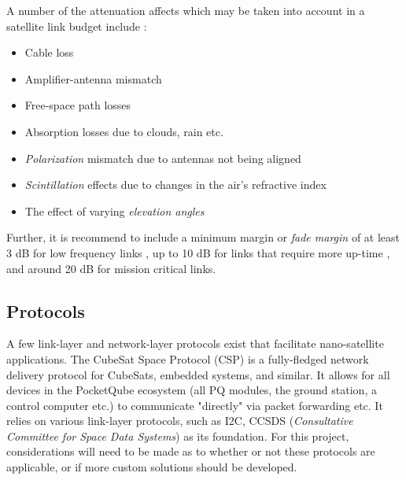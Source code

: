 A number of the attenuation affects which may be taken into account in a satellite link budget include \cite{design-satelliteLinkBudget}:
\begin{itemize}
    \item Cable loss
    \item Amplifier-antenna mismatch
    \item Free-space path losses
    \item Absorption losses due to clouds, rain etc.
    \item \textit{Polarization} mismatch due to antennas not being aligned
    \item \textit{Scintillation} effects due to changes in the air's refractive index
    \item The effect of varying \textit{elevation angles}
\end{itemize}

\noindent Further, it is recommend to include a minimum margin or \textit{fade margin} of at least 3 dB for low frequency links \cite{paper-linkMargin}, up to 10 dB for links that require more up-time \cite{design-linkBudgetDesign}, and around 20 dB for mission critical links.

\subsection{Protocols}
A few link-layer and network-layer protocols exist that facilitate nano-satellite applications. The CubeSat Space Protocol (CSP) \cite{standard-csp} is a fully-fledged network delivery protocol for CubeSats, embedded systems, and similar. It allows for all devices in the PocketQube ecosystem (all PQ modules, the ground station, a control computer etc.) to communicate "directly" via packet forwarding etc. It relies on various link-layer protocols, such as I2C, CCSDS (\textit{Consultative Committee for Space Data Systems}) as its foundation. For this project, considerations will need to be made as to whether or not these protocols are applicable, or if more custom solutions should be developed.
